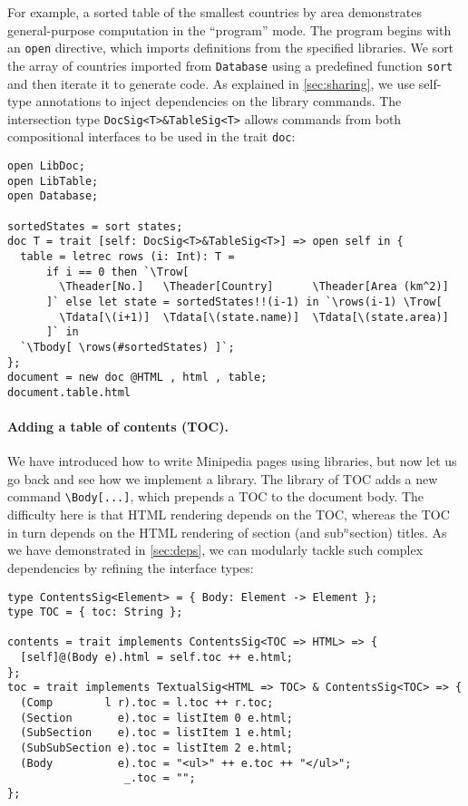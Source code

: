 For example, a sorted table of the smallest countries by area demonstrates
general-purpose computation in the ``program'' mode. The program begins with an
\lstinline{open} directive, which imports definitions from the specified
libraries. We sort the array of countries imported from \lstinline{Database}
using a predefined function \lstinline{sort} and then iterate it to generate
\ExT code. As explained in \autoref{sec:sharing}, we use self-type annotations
to inject dependencies on the library commands. The intersection type
\lstinline{DocSig<T>&TableSig<T>} allows \ExT commands from both compositional
interfaces to be used in the trait \lstinline{doc}:

\begin{lstlisting}
open LibDoc;
open LibTable;
open Database;

sortedStates = sort states;
doc T = trait [self: DocSig<T>&TableSig<T>] => open self in {
  table = letrec rows (i: Int): T =
      if i == 0 then `\Trow[
        \Theader[No.]   \Theader[Country]      \Theader[Area (km^2)]
      ]` else let state = sortedStates!!(i-1) in `\rows(i-1) \Trow[
        \Tdata[\(i+1)]  \Tdata[\(state.name)]  \Tdata[\(state.area)]
      ]` in
  `\Tbody[ \rows(#sortedStates) ]`;
};
document = new doc @HTML , html , table;
document.table.html
\end{lstlisting}

\paragraph{Adding a table of contents (TOC).}
We have introduced how to write Minipedia pages using \ExT libraries, but now
let us go back and see how we implement a \ExT library. The library of TOC adds
a new command \lstinline{\Body[...]}, which prepends a TOC to the document body.
The difficulty here is that HTML rendering depends on the TOC, whereas the TOC
in turn depends on the HTML rendering of section (and sub$^n$section) titles. As
we have demonstrated in \autoref{sec:deps}, we can modularly tackle such complex
dependencies by refining the interface types:

\begin{lstlisting}
type ContentsSig<Element> = { Body: Element -> Element };
type TOC = { toc: String };

contents = trait implements ContentsSig<TOC => HTML> => {
  [self]@(Body e).html = self.toc ++ e.html;
};
toc = trait implements TextualSig<HTML => TOC> & ContentsSig<TOC> => {
  (Comp        l r).toc = l.toc ++ r.toc;
  (Section       e).toc = listItem 0 e.html;
  (SubSection    e).toc = listItem 1 e.html;
  (SubSubSection e).toc = listItem 2 e.html;
  (Body          e).toc = "<ul>" ++ e.toc ++ "</ul>";
                  _.toc = "";
};
\end{lstlisting}

